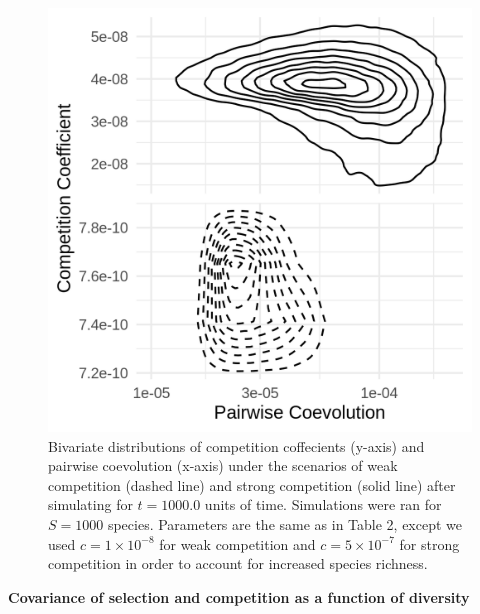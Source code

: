 \documentclass[]{article}
\begin{document}
\begin{figure}

{\centering \includegraphics[width=14.58in]{on_pl} 

}

\caption{\label{net}Bivariate distributions of competition coffecients (y-axis) and pairwise coevolution (x-axis) under the scenarios of weak competition (dashed line) and strong competition (solid line) after simulating for $t=1000.0$ units of time. Simulations were ran for $S=1000$ species. Parameters are the same as in Table 2, except we used $c=1\times 10^{-8}$ for weak competition and $c=5\times 10^{-7}$ for strong competition in order to account for increased species richness.}\label{fig:unnamed-chunk-8}
\end{figure}

\textbf{Covariance of selection and competition as a function of
diversity}
\end{document}

